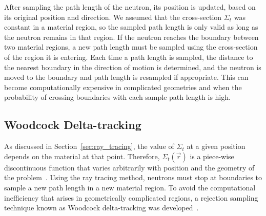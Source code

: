 After sampling the path length of the neutron, its position is
updated, based on its original position and direction. We assumed that
the cross-section $\Sigma_t$ was constant in a material region, so the
sampled path length is only valid as long as the neutron remains in
that region.  If the neutron reaches the boundary between two material
regions, a new path length must be sampled using the cross-section of
the region it is entering. Each time a path length is sampled, the
distance to the nearest boundary in the direction of motion is
determined, and the neutron is moved to the boundary and path length
is resampled if appropriate. This can become computationally expensive
in complicated geometries and when the probability of crossing
boundaries with each sample path length is high.

\subsection{Woodcock Delta-tracking}
\label{sec:delta-tracking}

As discussed in Section~\ref{sec:ray_tracing}, the value of $\Sigma_t$
at a given position depends on the material at that point. Therefore,
$\Sigma_t(\vec{r})$ is a piece-wise discontinuous function that varies
arbitrarily with position and the geometry of the
problem~\cite{leppanen2013}. Using the ray tracing method, neutrons
must stop at boundaries to sample a new path length in a new material
region. To avoid the computational inefficiency that arises in
geometrically complicated regions, a rejection sampling technique
known as Woodcock delta-tracking was developed~\cite{woodcock1965}.

